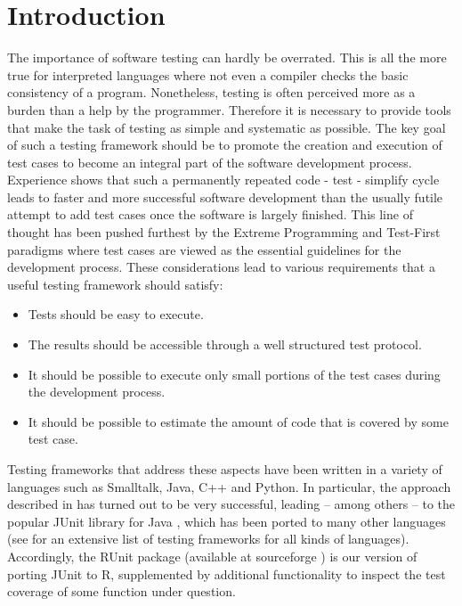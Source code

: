 \documentclass[12pt, a4paper]{article}
\begin{document}
\section{Introduction}
The importance of software testing can hardly be overrated. This
is all the more true for interpreted languages where not even a compiler
checks the basic consistency of a program. Nonetheless, testing is
often perceived more as a burden than a help by the
programmer. Therefore it is necessary to provide tools that make the
task of testing as simple and systematic as possible. The key goal of
such a testing framework should be to promote the creation and
execution of test cases to become an integral part of the software
development process. Experience shows that such a permanently repeated
code - test - simplify cycle leads to faster and more successful
software development than the usually futile attempt to add test cases
once the software is largely finished. This line of thought has been
pushed furthest by the Extreme Programming
\cite{xp} and Test-First paradigms
where test cases are viewed as the essential guidelines for the
development process. These considerations lead to various requirements
that a useful testing framework should satisfy:
\begin {itemize}
\item {Tests should be easy to execute.}
\item {The results should be accessible through a well structured test
    protocol.}
\item{It should be possible to execute only small portions of the test
    cases during the development process.}
\item{It should be possible to estimate the amount of code that is
    covered by some test case.}
\end {itemize}


Testing frameworks that address these aspects have been written in a
variety of languages such as Smalltalk, Java, C++ and Python. In
particular, the approach described in \cite{beck} has turned out to be
very successful, leading -- among others -- to the popular JUnit
library for Java \cite{junit}, which has
been ported to many other languages (see \cite{xp} for an extensive list of testing
frameworks for all kinds of languages). Accordingly, the RUnit package (available at sourceforge \cite{runit-sf}) is our
version of  porting JUnit to R, supplemented by additional
functionality to inspect the test coverage of some function under question.
\end{document}
